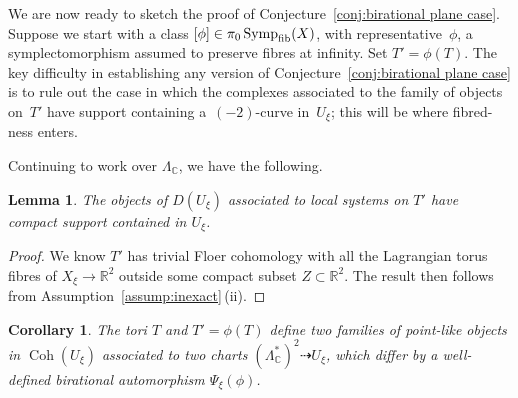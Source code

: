 \documentclass[pdftex]{sigma}
\newcommand {\Coh} {\operatorname{Coh}}
\DeclareMathOperator{\Symp}{Symp}
\def\bC{\mathbb{C}}
\def\bR{\mathbb{R}}
\newtheorem{lem}[thm]{Lemma}
\newtheorem{cor}[thm]{Corollary}
\theoremstyle{definition}
\numberwithin{equation}{section}
\begin{document}
We are now ready to sketch the proof of Conjecture~\ref{conj:birational plane case}. Suppose we start with a class $[\phi] \in \pi_0\Symp_{\rm fib}(X)$, with representative~$\phi$, a symplectomorphism assumed to preserve fibres at infinity. Set $T' = \phi(T) $.
The key difficulty in establishing any version of Conjecture~\ref{conj:birational plane case} is to rule out the case in which the complexes associated to the family of objects on~$T'$ have support containing a~$(-2)$-curve in~$U_{\xi}$; this will be where fibred-ness enters.


Continuing to work over $\Lambda_\bC$, we have the following.

\begin{lem}
The objects of $D(U_{\xi})$ associated to local systems on $T'$ have compact support contained in $U_{\xi}$.
\end{lem}

\begin{proof}
We know $T'$ has trivial Floer cohomology with all the Lagrangian torus fibres of $X_{\xi} \to \bR^2$ outside some compact subset $Z \subset \bR^2$. The result then follows from Assumption~\ref{assump:inexact}\,(ii).
\end{proof}


\begin{cor}
 The tori $T$ and $T'=\phi(T)$ define two families of point-like objects in $\Coh(U_\xi)$ associated to two charts $(\Lambda_\bC^*)^2 \dashrightarrow U_{\xi}$, which differ by a well-defined birational automorphism $\Psi_{\xi}(\phi)$.
\end{cor}
\end{document}
